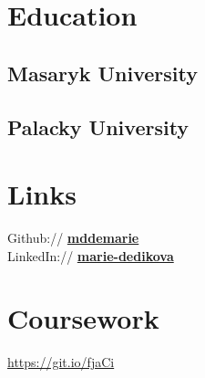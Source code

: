 \documentclass[letterpaper]{deedy-resume} %
\begin{document}
\begin{minipage}[t]{0.33\textwidth} %



\section{Education} 

\subsection{Masaryk University}


\sectionspace %
\sectionspace %


\subsection{Palacky University}


\sectionspace %
\sectionspace %


\section{Links} 

Github:// \href{https://github.com/mddemarie}{\bf mddemarie} \\
LinkedIn:// \href{linkedin.com/in/marie-dedikova}{\bf marie-dedikova} \\

\sectionspace %
\sectionspace %


\section{Coursework}

\url{https://git.io/fjaCi}

\sectionspace %
\sectionspace %

\end{minipage} %
\end{document}
